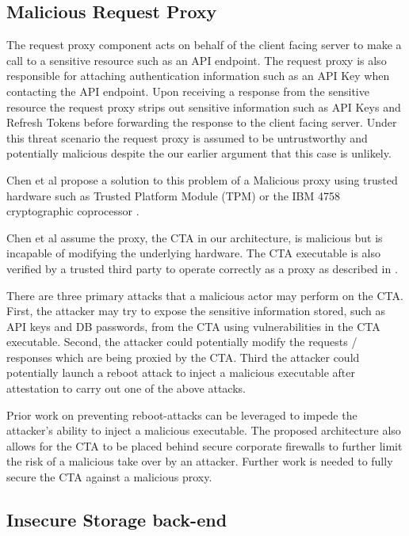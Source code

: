 \documentclass[a4paper,twoside]{article}
\begin{document}
\subsection{Malicious Request Proxy}

The request proxy component acts on behalf of the client facing server to make a call to a sensitive resource such as an API endpoint. The request proxy is also responsible for attaching authentication information such as an API Key when contacting the API endpoint. Upon receiving a response from the sensitive resource the request proxy strips out sensitive information such as API Keys and Refresh Tokens before forwarding the response to the client facing server.  Under this threat scenario the request proxy is assumed to be untrustworthy and potentially malicious despite the our earlier argument that this case is unlikely.

Chen et al \cite{chen_towards_2012} propose a solution to this problem of a Malicious proxy using trusted hardware such as Trusted Platform Module (TPM) or the IBM 4758 cryptographic coprocessor \cite{parno_bootstrapping_2010}. 

Chen et al assume the proxy, the CTA in our architecture, is malicious but is incapable of modifying the underlying hardware. The CTA executable is also verified by a trusted third party to operate correctly as a proxy as described in \cite{parno_bootstrapping_2010}.

There are three primary attacks that a malicious actor may perform on the CTA. First, the attacker may try to expose the sensitive information stored, such as API keys and DB passwords, from the CTA using vulnerabilities in the CTA executable. Second, the attacker could potentially modify the requests / responses which are being proxied by the CTA. Third the attacker could potentially launch a reboot attack to inject a malicious executable after attestation to carry out one of the above attacks.

Prior work \cite{libert_tracing_2008, mccune_flicker:_2008} on preventing reboot-attacks can be leveraged to impede the attacker's ability to inject a malicious executable. The proposed architecture also allows for the CTA to be placed behind secure corporate firewalls to further limit the risk of a malicious take over by an attacker. Further work is needed to fully secure the CTA against a malicious proxy.

\subsection{Insecure Storage back-end}
\end{document}
